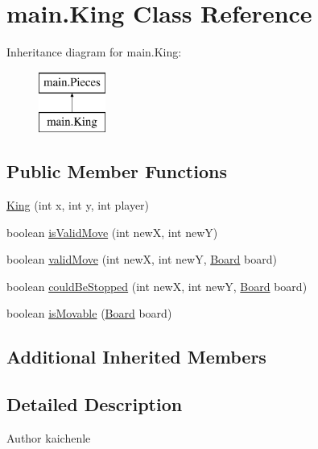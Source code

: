 \hypertarget{classmain_1_1_king}{}\section{main.\+King Class Reference}
\label{classmain_1_1_king}
Inheritance diagram for main.\+King\+:\begin{figure}[H]
\begin{center}
\leavevmode
\includegraphics[height=2.000000cm]{classmain_1_1_king}
\end{center}
\end{figure}
\subsection*{Public Member Functions}
\begin{DoxyCompactItemize}
\item 
\mbox{\hyperlink{classmain_1_1_king_ae513926e77ae13577530d820c400e6f3}{King}} (int x, int y, int player)
\item 
boolean \mbox{\hyperlink{classmain_1_1_king_ac7fc89ee4c93a500d49ec3dede5282d6}{is\+Valid\+Move}} (int newX, int newY)
\item 
boolean \mbox{\hyperlink{classmain_1_1_king_af01e8aeb9a6a32c89b0b60d47a90232b}{valid\+Move}} (int newX, int newY, \mbox{\hyperlink{classmain_1_1_board}{Board}} board)
\item 
boolean \mbox{\hyperlink{classmain_1_1_king_ab04709bedac4618b9683cb09dc0dbdc3}{could\+Be\+Stopped}} (int newX, int newY, \mbox{\hyperlink{classmain_1_1_board}{Board}} board)
\item 
boolean \mbox{\hyperlink{classmain_1_1_king_a30d717327a122f2ef2e07760914c5e33}{is\+Movable}} (\mbox{\hyperlink{classmain_1_1_board}{Board}} board)
\end{DoxyCompactItemize}
\subsection*{Additional Inherited Members}


\subsection{Detailed Description}
\begin{DoxyAuthor}{Author}
kaichenle 
\end{DoxyAuthor}


